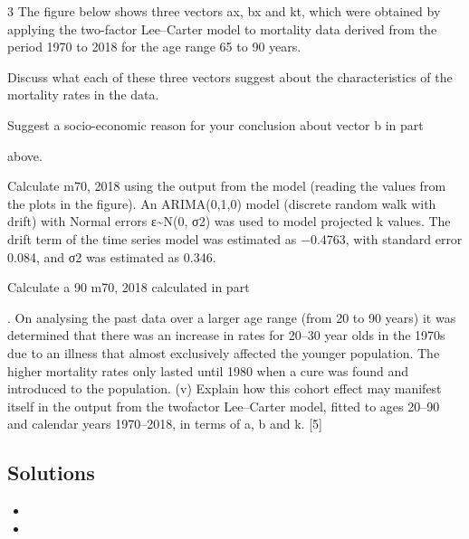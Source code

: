 3 The figure below shows three vectors ax, bx and kt, which were obtained by applying
the two-factor Lee–Carter model to mortality data derived from the period 1970 to
2018 for the age range 65 to 90 years.
\item   Discuss what each of these three vectors suggest about the characteristics of
the mortality rates in the data. 

\item   Suggest a socio-economic reason for your conclusion about vector b in part \item  
above. 
\item  Calculate m70, 2018 using the output from the model (reading the values from
the plots in the figure). 
An ARIMA(0,1,0) model (discrete random walk with drift) with Normal errors
ε\sim N(0, σ2) was used to model projected k values. The drift term of the time series
model was estimated as −0.4763, with standard error 0.084, and σ2 was estimated as
0.346.
\item  Calculate a 90%
m70, 2018 calculated in part \item .
On analysing the past data over a larger age range (from 20 to 90 years) it was
determined that there was an increase in rates for 20–30 year olds in the 1970s due
to an illness that almost exclusively affected the younger population. The higher
mortality rates only lasted until 1980 when a cure was found and introduced to the
population.
(v) Explain how this cohort effect may manifest itself in the output from the twofactor
Lee–Carter model, fitted to ages 20–90 and calendar years 1970–2018,
in terms of a, b and k. [5]

\subsection*{Solutions}

\begin{itemize}
\item
\item
\end{itemize}


